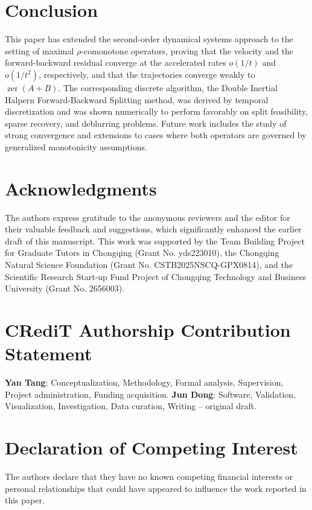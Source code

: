 \documentclass{article}
\theoremstyle{definition}
\theoremstyle{definition}
\theoremstyle{definition}
\begin{document}
\section{Conclusion}
\label{sec:conclusion}

This paper has extended the second-order dynamical systems approach to the setting of maximal $\rho$-comonotone operators, proving that the velocity and the forward-backward residual converge at the accelerated rates $o(1/t)$ and $o(1/t^{2})$, respectively, and that the trajectories converge weakly to $\operatorname{zer}(A+B)$. The corresponding discrete algorithm, the Double Inertial Halpern Forward-Backward Splitting method, was derived by temporal discretization and was shown numerically to perform favorably on split feasibility, sparse recovery, and deblurring problems. Future work includes the study of strong convergence and extensions to cases where both operators are governed by generalized monotonicity assumptions.

\section*{Acknowledgments}

The authors express gratitude to the anonymous reviewers and the editor for their valuable feedback and suggestions, which significantly enhanced the earlier draft of this manuscript. This work was supported by the Team Building Project for Graduate Tutors in Chongqing (Grant No. yds223010), the Chongqing Natural Science Foundation (Grant No. CSTB2025NSCQ-GPX0814), and the Scientific Research Start-up Fund Project of Chongqing Technology and Business University (Grant No. 2656003).

\section*{CRediT Authorship Contribution Statement}

\textbf{Yan Tang}: Conceptualization, Methodology, Formal analysis, Supervision, Project administration, Funding acquisition. \textbf{Jun Dong}: Software, Validation, Visualization, Investigation, Data curation, Writing -- original draft.

\section*{Declaration of Competing Interest}

The authors declare that they have no known competing financial interests or personal relationships that could have appeared to influence the work reported in this paper.
\end{document}
